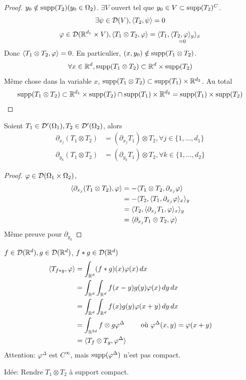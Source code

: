 \documentclass[]{report}
\begin{document}
    \begin{proof}
        $y_0\notin \text{supp}(T_2)(y_0\in \Omega_2)$. $\exists V$ ouvert tel que $y_0\in V\subset \text{supp}(T_2)^C$.\\
        \[\exists \psi \in \mathcal{D}(V),\langle T_2,\psi \rangle=0\]
        \[\varphi\in \mathcal{D}(\mathbb{R}^{d_1}\times V),\langle T_1\otimes T_2,\varphi \rangle=\langle T_1,\underset{=0}{\langle T_2,\varphi \rangle_y} \rangle_x\]
        Donc $\langle T_1\otimes T_2,\varphi \rangle=0$. En particulier, $(x,y_0)\notin \text{supp}(T_1\otimes T_2)$.
        \[\forall x\in \mathbb{R}^d,\text{supp}(T_1\otimes T_2)\subset \mathbb{R}^d\times \text{supp}(T_2)\]
        Même chose dans la variable $x$, $\text{supp}(T_1\otimes T_2)\subset \text{supp} (T_1)\times \mathbb{R}^{d_2}$. Au total
        \[\text{supp}(T_1\otimes T_2)\subset \mathbb{R}^{d_1}\times \text{supp}(T_2)\cap \text{supp}(T_1)\times \mathbb{R}^{d_2}=\text{supp}(T_1)\times \text{supp}(T_2)\]
    \end{proof}

    \begin{prop}{}{}
        Soient $T_1\in \mathcal{D}'(\Omega_1),T_2\in \mathcal{D}'(\Omega_2)$, alors
        \begin{align*}
            \partial_{x_j}(T_1\otimes T_2)&=(\partial_{x_j}T_1)\otimes T_2,\forall j\in \{1,\ldots,d_1\}\\
            \partial_{y_k}(T_1\otimes T_2)&=(\partial_{y_k}T_1)\otimes T_2,\forall k\in \{1,\ldots,d_2\}
        \end{align*}
    \end{prop}

    \begin{proof}
        $\varphi\in \mathcal{D}(\Omega_1\times \Omega_2)$,
        \begin{align*}
            \langle \partial_{x_j}(T_1\otimes T_2),\varphi \rangle&=-\langle T_1\otimes T_2,\partial_{x_j}\varphi \rangle\\
            &=-\langle T_2,\langle T_1,\partial_{x_j}\varphi \rangle_x \rangle_y\\
            &=\langle T_2,\langle \partial_{x_j}T_1,\varphi \rangle_x \rangle_y\\
            &=\langle \partial_{x_j}T_1\otimes T_2,\varphi \rangle
        \end{align*}
        Même preuve pour $\partial_{y_k}$
    \end{proof}

    \begin{re}{}{}
        $f\in \mathcal{D}(\mathbb{R}^d),g\in \mathcal{D}(\mathbb{R}^d)$, $f*g\in \mathcal{D}(\mathbb{R}^d)$
        \begin{align*}
            \langle T_{f*g},\varphi \rangle&=\int_{\mathbb{R}^d}(f*g)(x)\varphi(x)\, dx\\
            &=\int_{\mathbb{R}^d}\int_{\mathbb{R}^d}f(x-y)g(y)\varphi(x)\, dy\, dx\\
            &=\int_{\mathbb{R}^d}\int_{\mathbb{R}^d}f(x)g(y)\varphi(x+y)\, dy\, dx\\
            &=\int_{\mathbb{R}^{2d}}f\otimes g\varphi^{\Delta}\qquad \text{ où $\varphi^{\Delta}(x,y)=\varphi(x+y)$}\\
            &=\langle T_f\otimes T_g,\varphi^{\Delta} \rangle
        \end{align*}
        Attention: $\varphi^{\Delta}$ est $C^\infty$, mais $\text{supp}(\varphi^{\Delta})$ n'est pas compact.
    \end{re}
    Idée: Rendre $T_1\otimes T_2$ à support compact.
\end{document}
